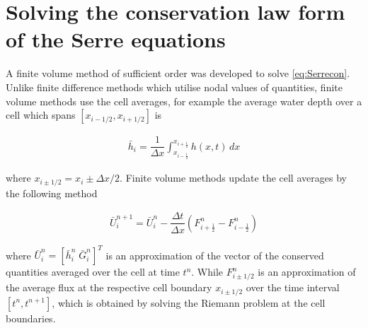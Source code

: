 \documentclass[SingleSpace,12pt,Proceedings]{Serre_ASCE}
\begin{document}
\section{Solving the conservation law form of the Serre equations}
A finite volume method of sufficient order was developed to solve \eqref{eq:Serrecon}. Unlike finite difference methods which utilise nodal values of quantities, finite volume methods use the cell averages, for example the average water depth over a cell which spans $\left[x_{i - 1/2} , x_{i + 1/2}\right]$ is 
\begin{linenomath*}
\begin{gather*}
\bar{h}_i = \dfrac{1}{\Delta x} \int_{x_{i-\frac{1}{2}}}^{x_{i+\frac{1}{2}}} h(x,t) \, dx 
\end{gather*}
\end{linenomath*}
where $x_{i \pm 1/2} = x_i \pm \Delta x/2$. Finite volume methods update the cell averages by the following method
\begin{linenomath*}
\begin{gather}\label{eq:FVMupdate}
\bar{U}^{n+1}_i = \bar{U}^{n}_i - \dfrac{\Delta t}{\Delta x} \left(F^n_{i+ \frac{1}{2}} - F^n_{i - \frac{1}{2}} \right)
\end{gather}
\end{linenomath*}
where $\bar{U}^{n}_i = \left[ \bar{h}^{n}_i \; \bar{G}^{n}_i \right] ^T$ is an approximation of the vector of the conserved quantities averaged over the cell at time $t^n$. While $F^n_{i\pm 1/2}$ is an approximation of the average flux at the respective cell boundary $x_{i \pm 1/2 }$ over the time interval $[t^n, t^{n+1}]$, which is obtained by solving the Riemann problem at the cell boundaries.
\end{document}
